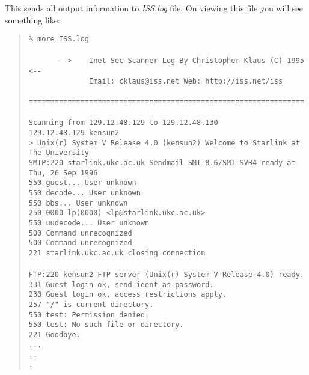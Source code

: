 \documentclass[11pt]{article}
\begin{document}
This sends all output information to {\it ISS.log} file. On viewing
this file you will see something like:

\begin{quote}
\begin{scriptsize}
\verb+% more ISS.log+\\
\verb++\\
\verb+       -->    Inet Sec Scanner Log By Christopher Klaus (C) 1995    <--+\\
\verb+              Email: cklaus@iss.net Web: http://iss.net/iss+\\
\verb+       ================================================================+\\
\verb++\\
\verb+Scanning from 129.12.48.129 to 129.12.48.130+\\
\verb+129.12.48.129 kensun2+\\
\verb+> Unix(r) System V Release 4.0 (kensun2) Welcome to Starlink at The University+\\
\verb+SMTP:220 starlink.ukc.ac.uk Sendmail SMI-8.6/SMI-SVR4 ready at Thu, 26 Sep 1996+\\
\verb+550 guest... User unknown+\\
\verb+550 decode... User unknown+\\
\verb+550 bbs... User unknown+\\
\verb+250 0000-lp(0000) <lp@starlink.ukc.ac.uk>+\\
\verb+550 uudecode... User unknown+\\
\verb+500 Command unrecognized+\\
\verb+500 Command unrecognized+\\
\verb+221 starlink.ukc.ac.uk closing connection+\\
\verb++\\
\verb+FTP:220 kensun2 FTP server (Unix(r) System V Release 4.0) ready.+\\
\verb+331 Guest login ok, send ident as password.+\\
\verb+230 Guest login ok, access restrictions apply.+\\
\verb+257 "/" is current directory.+\\
\verb+550 test: Permission denied.+\\
\verb+550 test: No such file or directory.+\\
\verb+221 Goodbye.+\\
\verb+...+\\
\verb+..+\\
\verb+.+
\end{scriptsize}
\end{quote}
\end{document}
